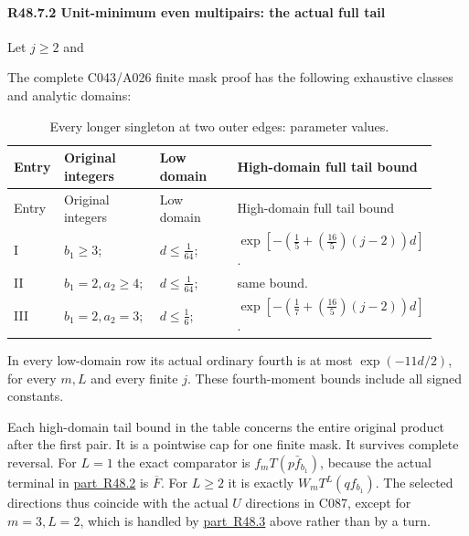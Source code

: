 \paragraph{R48.7.2 Unit-minimum even multipairs: the actual full tail}

Let \(j\ge 2\) and


The complete C043/A026 finite mask proof has the following exhaustive classes and analytic domains:


\begingroup\small
\setlength{\tabcolsep}{3pt}
\setlength{\LTleft}{0pt}\setlength{\LTright}{\fill}
\begin{longtable}{@{}p{0.1200\linewidth}p{0.2667\linewidth}p{0.2667\linewidth}p{0.2667\linewidth}@{}}
\caption{Every longer singleton at two outer edges: parameter values.}\label{tab:parameters:r2-c048:7}\\
\toprule
Entry & Original integers & Low domain & High-domain full tail bound \\
\midrule\endfirsthead
\toprule
Entry & Original integers & Low domain & High-domain full tail bound \\
\midrule\endhead
\bottomrule\endfoot
I & \(b_{1}\ge 3\); & \(d\le \frac{1}{64}\); & \(\exp[-(\frac{1}{5}+(\frac{16}{5})(j-2))d]\). \\
\addlinespace[2pt]
II & \(b_{1}=2,\allowbreak \allowbreak a_{2}\ge 4\); & \(d\le \frac{1}{64}\); & same bound. \\
\addlinespace[2pt]
III & \(b_{1}=2,\allowbreak \allowbreak a_{2}=3\); & \(d\le \frac{1}{6}\); & \(\exp[-(\frac{1}{7}+(\frac{16}{5})(j-2))d]\). \\
\end{longtable}
\endgroup


In every low-domain row its actual ordinary fourth is at most \(\exp(-11d/2)\), for every \(m,\allowbreak \allowbreak L\) and every finite \(j\). These fourth-moment bounds include all signed constants.

Each high-domain tail bound in the table concerns the entire original product after the first pair. It is a pointwise cap for one finite mask. It survives complete reversal. For \(L=1\) the exact comparator is \(f_m T(p\bar f_{b_1})\), because the actual terminal in \mbox{\hyperref[part:R48.2]{part R48.2}} is \(\overline F\). For \(L\ge 2\) it is exactly \(W_m T^L(q f_{b_{1}})\). The selected directions thus coincide with the actual \(U\) directions in C087, except for \(m=3,\allowbreak \allowbreak L=2\), which is handled by \mbox{\hyperref[part:R48.3]{part R48.3}} above rather than by a turn.

